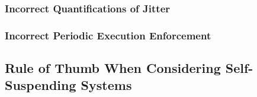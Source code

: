 \subsubsection{Incorrect Quantifications of Jitter}
\label{sec:wrong-jitter}


\subsubsection{Incorrect Periodic Execution Enforcement}
\label{sec:wrong-periodic}

\subsection{Rule of Thumb When Considering Self-Suspending Systems}
  
  
  
  
  
  
  
  
  
  
  
  
  
  
  
  
  





  